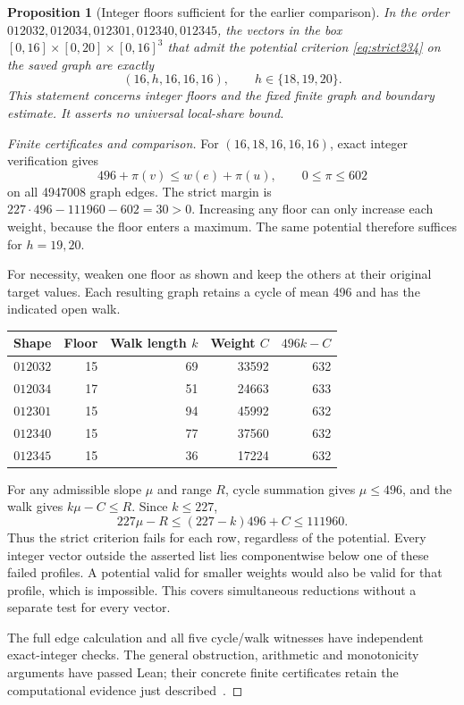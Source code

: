 \documentclass[11pt,a4paper]{article}
\newtheorem{proposition}[theorem]{Proposition}
\theoremstyle{definition}
\theoremstyle{remark}
\begin{document}
\begin{proposition}[Integer floors sufficient for the earlier comparison]\label{prop:least-floors}
In the order $012032,012034,012301,012340,012345$, the vectors in the box
$[0,16]\times[0,20]\times[0,16]^3$ that admit the potential criterion
\eqref{eq:strict234} on the saved graph are exactly
\[
(16,h,16,16,16),\qquad h\in\{18,19,20\}.
\]
This statement concerns integer floors and the fixed finite graph and
boundary estimate. It asserts no universal local-share bound.
\end{proposition}
\begin{proof}[Finite certificates and comparison]
For $(16,18,16,16,16)$, exact integer verification gives
\[
496+\pi(v)\le w(e)+\pi(u),\qquad 0\le\pi\le602
\]
on all 4947008 graph edges. The strict margin is
$227\cdot496-111960-602=30>0$. Increasing any floor can only increase each
weight, because the floor enters a maximum. The same potential therefore
suffices for $h=19,20$.

For necessity, weaken one floor as shown and keep the others at their
original target values. Each resulting graph retains a cycle of mean 496
and has the indicated open walk.
\begin{center}\small
\begin{tabular}{c r r r r}
\toprule
Shape & Floor & Walk length $k$ & Weight $C$ & $496k-C$\\\midrule
$012032$ & 15 & 69 & 33592 & 632\\
$012034$ & 17 & 51 & 24663 & 633\\
$012301$ & 15 & 94 & 45992 & 632\\
$012340$ & 15 & 77 & 37560 & 632\\
$012345$ & 15 & 36 & 17224 & 632\\\bottomrule
\end{tabular}
\end{center}
For any admissible slope $\mu$ and range $R$, cycle summation gives
$\mu\le496$, and the walk gives $k\mu-C\le R$. Since $k\le227$,
\[
227\mu-R\le(227-k)496+C\le111960.
\]
Thus the strict criterion fails for each row, regardless of the potential.
Every integer vector outside the asserted list lies componentwise below
one of these failed profiles. A potential valid for smaller weights would
also be valid for that profile, which is impossible. This covers simultaneous
reductions without a separate test for every vector.

The full edge calculation and all five cycle/walk witnesses have independent
exact-integer checks. The general obstruction, arithmetic and monotonicity
arguments have passed Lean; their concrete finite certificates retain the
computational evidence just described~\cite{weightintegrationarchive}.
\end{proof}
\end{document}
